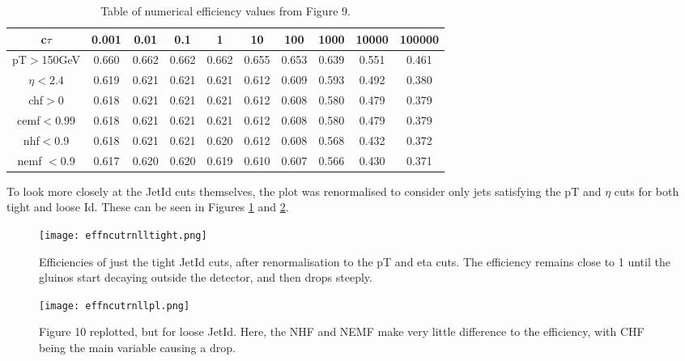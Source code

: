 \documentclass{article}
\begin{document}
\begin{table}
\begin{center}
\begin{tabular}{ |c|c|c|c|c|c|c|c|c|c| } 
 \hline
 c$\tau$ &0.001 & 0.01 & 0.1 & 1 & 10 & 100 & 1000 & 10000 & 100000 \\ 
 \hline

 pT$>$150GeV & 0.660& 0.662& 0.662& 0.662& 0.655& 0.653& 0.639& 0.551& 0.461\\
 \hline
 $\eta<2.4$ & 0.619& 0.621& 0.621& 0.621& 0.612& 0.609& 0.593& 0.492& 0.380 \\
 \hline
 chf$>$0 &0.618& 0.621& 0.621& 0.621& 0.612& 0.608& 0.580& 0.479& 0.379 \\
 \hline
 cemf$<$0.99 & 0.618& 0.621& 0.621& 0.621& 0.612& 0.608& 0.580& 0.479& 0.379\\
 \hline
 nhf$<$0.9 & 0.618& 0.621& 0.621& 0.620& 0.612& 0.608& 0.568& 0.432& 0.372 \\
 \hline
 nemf $<$0.9& 0.617& 0.620& 0.620& 0.619& 0.610& 0.607&
 0.566& 0.430& 0.371\\
 \hline
\end{tabular}

\caption{Table of numerical efficiency values from Figure 9. }
	\label{idt2}
\end{center}
\end{table}

To look more closely at the JetId cuts themselves, the plot was renormalised to consider only jets satisfying the pT and $\eta$ cuts for both tight and loose Id. These can be seen in Figures \ref{id3} and \ref{id4}. 

\begin{figure}[H]
\centering
\texttt{[image: effncutrnlltight.png]}
\caption{Efficiencies of just the tight JetId cuts, after renormalisation to the pT and eta cuts. The efficiency remains close to 1 until the gluinos start decaying outside the detector, and then drops steeply.}
	\label{id3}
\end{figure}

\begin{figure}[H]
\centering
\texttt{[image: effncutrnllpl.png]}
\caption{Figure 10 replotted, but for loose JetId. Here, the NHF and NEMF make very little difference to the efficiency, with CHF being the main variable causing a drop.}
	\label{id4}
\end{figure}
\end{document}
